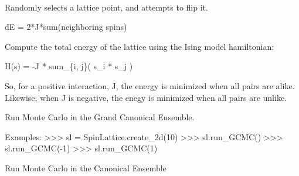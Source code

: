 \documentclass[letterpaper,10pt,english]{sphinxmanual}
\begin{document}
\begin{fulllineitems}
\label{models:qmpy.SpinLattice}~

\begin{fulllineitems}
\label{models:qmpy.SpinLattice.attempt_flip}
Randomly selects a lattice point, and attempts to flip it.

dE = 2*J*sum(neighboring spins)

\end{fulllineitems}


\begin{fulllineitems}
\label{models:qmpy.SpinLattice.compute_total_lattice_energy}
Compute the total energy of the lattice using the Ising model
hamiltonian:

H(s) = -J * sum\_\{i, j\}( s\_i * s\_j )

So, for a positive interaction, J, the energy is minimized when all
pairs are alike. Likewise, when J is negative, the enegy is minimized
when all pairs are unlike.

\end{fulllineitems}


\begin{fulllineitems}
\label{models:qmpy.SpinLattice.run_GCMC}
Run Monte Carlo in the Grand Canonical Ensemble.

Examples:
\textgreater{}\textgreater{}\textgreater{} sl = SpinLattice.create\_2d(10)
\textgreater{}\textgreater{}\textgreater{} sl.run\_GCMC()
\textgreater{}\textgreater{}\textgreater{} sl.run\_GCMC(-1)
\textgreater{}\textgreater{}\textgreater{} sl.run\_GCMC(1)

\end{fulllineitems}


\begin{fulllineitems}
\label{models:qmpy.SpinLattice.run_MC}
Run Monte Carlo in the Canonical Ensemble


\end{fulllineitems}
\end{fulllineitems}
\end{document}
